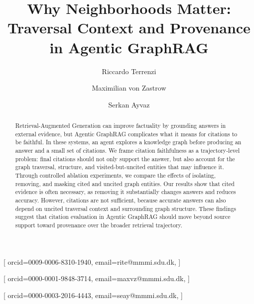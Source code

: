 \documentclass[
]{ceurart}
\begin{document}


\title{Why Neighborhoods Matter: Traversal Context and Provenance in Agentic GraphRAG}

\author[1]{Riccardo Terrenzi}[%
orcid=0009-0006-8310-1940,
email=rite@mmmi.sdu.dk,
]
\address[1]{Centre for Industrial Software, University of Southern Denmark, Alsion 2, 6400 Sønderborg, Denmark}

\author[1]{Maximilian von Zastrow}[%
orcid=0000-0001-9848-3714,
email=maxvz@mmmi.sdu.dk,
]

\author[1]{Serkan Ayvaz}[%
orcid=0000-0003-2016-4443,
email=seay@mmmi.sdu.dk,
]
\cormark[1]


\begin{abstract}
Retrieval-Augmented Generation can improve factuality by grounding answers in external evidence, but Agentic GraphRAG complicates what it means for citations to be faithful. In these systems, an agent explores a knowledge graph before producing an answer and a small set of citations. We frame citation faithfulness as a trajectory-level problem: final citations should not only support the answer, but also account for the graph traversal, structure, and visited-but-uncited entities that may influence it. Through controlled ablation experiments, we compare the effects of isolating, removing, and masking cited and uncited graph entities. Our results show that cited evidence is often necessary, as removing it substantially changes answers and reduces accuracy. However, citations are not sufficient, because accurate answers can also depend on uncited traversal context and surrounding graph structure. These findings suggest that citation evaluation in Agentic GraphRAG should move beyond source support toward provenance over the broader retrieval trajectory.
\end{abstract}
\end{document}
